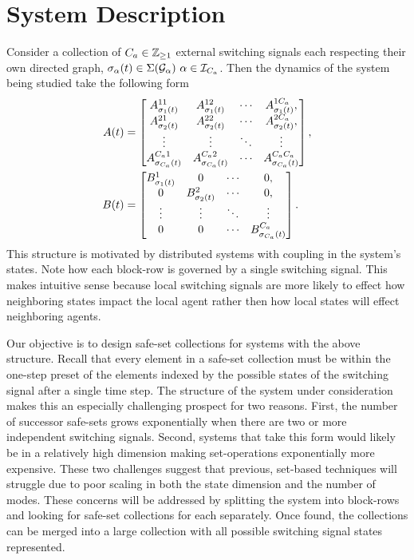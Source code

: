 
\section{System Description}
Consider a collection of ${C_a}\in\mathbb{Z}_{\geq 1}$ external switching signals each respecting their own directed graph, $\ss_\agentidx(t)\in\Sigma(\graph_\agentidx)\ \agentidx\in\idxset{\numagents}$. Then the dynamics of the system being studied take the following form
\begin{align}
A(t)&=\begin{bmatrix}
A^{11}_{{\sigma}_1(t)}&A^{12}_{{\sigma}_1(t)}&\cdots&A^{1{C_a}}_{{\sigma}_1(t)},\\
A^{21}_{{\sigma}_2(t)}&A^{22}_{{\sigma}_2(t)}&\cdots&A^{2{C_a}}_{{\sigma}_2(t)},\\
\vdots&\vdots & \ddots & \vdots\\
A^{{C_a} 1}_{{\sigma}_{{C_a}}(t)} & A^{{C_a} 2}_{{\sigma}_{{C_a}}(t)} &\cdots & A^{{C_a} {C_a}}_{{\sigma}_{{C_a}}(t)} 
\end{bmatrix},\\
B(t)&=\begin{bmatrix}
B^{1}_{{\sigma}_1(t)}&0&\cdots&0,\\
0&B^{2}_{{\sigma}_2(t)}&\cdots&0,\\
\vdots&\vdots & \ddots & \vdots\\
0 & 0 &\cdots & B^{{C_a}}_{{\sigma}_{{C_a}}(t)} 
\end{bmatrix}.
\end{align}
This structure is motivated by distributed systems with coupling in the system's states. Note how each block-row is governed by a single switching signal. This makes intuitive sense because local switching signals are more likely to effect how neighboring states impact the local agent rather then how local states will effect neighboring agents.

Our objective is to design safe-set collections for systems with the above structure. Recall that every element in a safe-set collection must be within the one-step preset of the elements indexed by the possible states of the switching signal after a single time step. The structure of the system under consideration makes this an especially challenging prospect for two reasons. First, the number of successor safe-sets grows exponentially when there are two or more independent switching signals. Second, systems that take this form would likely be in a relatively high dimension making set-operations exponentially more expensive. These two challenges suggest that previous, set-based techniques will struggle due to poor scaling in both the state dimension and the number of modes. These concerns will be addressed by splitting the system into block-rows and looking for safe-set collections for each separately. Once found, the collections can be merged into a large collection with all possible switching signal states represented.

